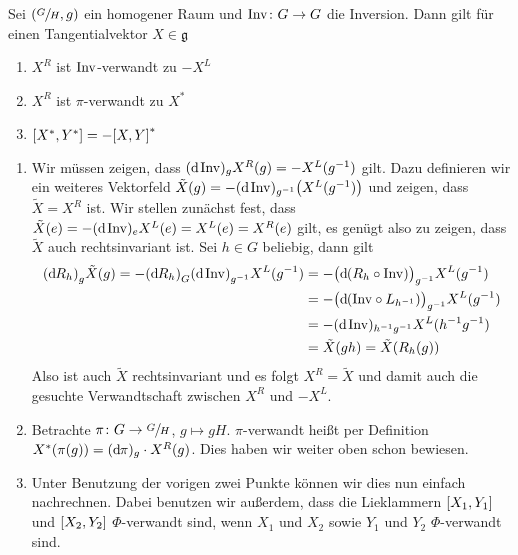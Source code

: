 \begin{lemma}[{name=[Verwandtschaft von Killingvektorfeldern]}]
	Sei $\enbrace*{\sfrac{G}{H},g}$ ein homogener Raum und $\Inv \colon G\to G$ die Inversion.
	Dann gilt für einen Tangentialvektor $X \in \mathfrak{g}$ 
	\begin{enumerate}[1)]
		\item $X^R$ ist $\Inv$-verwandt zu $-X^L$
		\item $X^R$ ist $\pi$-verwandt zu $X^*$
		\item $\benbrace*{X^*,Y^*} = - \benbrace*{X,Y}^*$
	\end{enumerate}
\end{lemma}
\begin{beweis}
	\begin{enumerate}[1)]
		\item Wir müssen zeigen, dass $(\mathd \Inv)_g X^R(g) = - X^L(g^{-1})$ gilt.
		Dazu definieren wir ein weiteres Vektorfeld $\tilde{X}(g) = - (\mathd \Inv)_{g^{-1}} \enbrace*{X^L(g^{-1})}$ und zeigen, dass $\tilde{X}=X^R$ ist.
		Wir stellen zunächst fest, dass $\tilde{X}(e) = - (\mathd \Inv)_e X^L(e) = X^L(e)=X^R(e)$ gilt, es genügt also zu zeigen, dass $\tilde{X}$ auch rechtsinvariant ist.
		Sei $h \in G$ beliebig, dann gilt
		\begin{align}
			\enbrace*{\mathd R_h}_g \tilde{X}(g) = - \enbrace*{\mathd R_h}_G \enbrace*{\mathd \Inv}_{g^{-1}} X^L(g^{-1}) &= - \enbrace[\big]{\mathd \enbrace*{R_h \circ \Inv}}_{g^{-1}} X^L(g^{-1}) \\
			&= - \enbrace[\big]{\mathd \enbrace*{{\Inv} \circ L_{h^{-1}}}}_{g^{-1}} X^L(g^{-1}) \\
			&= - (\mathd \Inv)_{h^{-1}g^{-1}} X^L(h^{-1} g^{-1}) \\
			&= \tilde{X}(gh) = \tilde{X}\enbrace*{R_h(g)}
		\end{align}
		Also ist auch $\tilde{X}$ rechtsinvariant und es folgt $X^R = \tilde{X}$ und damit auch die gesuchte Verwandtschaft zwischen $X^R$ und $-X^L$.
		\item Betrachte $\pi \colon G \to \sfrac{G}{H}$, $g \mapsto gH$. 
		$\pi$-verwandt heißt per Definition $X^*(\pi(g)) = (\mathd \pi)_g \cdot X^R(g)$. 
		Dies haben wir weiter oben schon bewiesen.
		\item Unter Benutzung der vorigen zwei Punkte können wir dies nun einfach nachrechnen.
		Dabei benutzen wir außerdem, dass die Lieklammern $\benbrace*{X_1,Y_1}$ und $\benbrace*{X_2,Y_2}$ $\Phi$-verwandt sind, wenn $X_1$ und $X_2$ sowie $Y_1$ und $Y_2$ $\Phi$-verwandt sind.

\end{enumerate}
\end{beweis}
